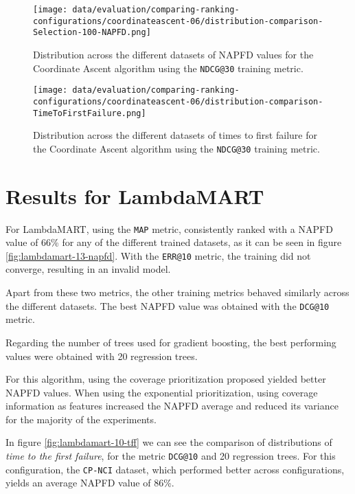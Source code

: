 \begin{figure}
    \centering
    \begin{minipage}{.45\textwidth}
        \centering
        \texttt{[image: data/evaluation/comparing-ranking-configurations/coordinateascent-06/distribution-comparison-Selection-100-NAPFD.png]}
        \parbox{0.9\textwidth}{
            \caption{Distribution across the different datasets of NAPFD values for the Coordinate Ascent algorithm using the \texttt{NDCG@30} training metric.}
        \label{fig:zcoordinate-ascent-06-napfd}
            }
    \end{minipage}%
    \begin{minipage}{.45\textwidth}
        \centering
        \texttt{[image: data/evaluation/comparing-ranking-configurations/coordinateascent-06/distribution-comparison-TimeToFirstFailure.png]}
        \parbox{0.9\textwidth}{
            \caption{Distribution across the different datasets of times to first failure for the Coordinate Ascent algorithm using the \texttt{NDCG@30} training metric.}
        \label{fig:kcoordinate-ascent-06-tff}
            }
    \end{minipage}%
\end{figure}

\section{Results for LambdaMART}
For LambdaMART, using the \texttt{MAP} metric, consistently ranked with a NAPFD value of 66\% for any of the different 
trained datasets, as it can be seen in figure \ref{fig:lambdamart-13-napfd}. With the \texttt{ERR@10} metric, the training did not converge, resulting in an invalid model.

Apart from these two metrics, the other training metrics behaved similarly across the different datasets. The best NAPFD
value was obtained with the \texttt{DCG@10} metric.

Regarding the number of trees used for gradient boosting, the best performing values were obtained with 20 regression trees.

For this algorithm, using the coverage prioritization proposed yielded better NAPFD values. When using the exponential prioritization,
using coverage information as features increased the NAPFD average and reduced its variance for the majority of the experiments.

In figure \ref{fig:lambdamart-10-tff} we can see the comparison of distributions of \emph{time to the first failure},
for the metric \texttt{DCG@10} and 20 regression trees. For this configuration, the \texttt{CP-NCI} dataset,
which performed better across configurations, yields an average NAPFD value of 86\%.

